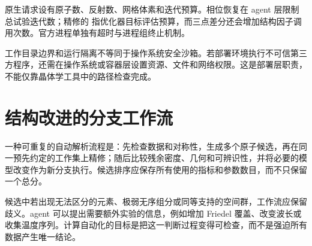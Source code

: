 原生请求设有原子数、反射数、网格体素和迭代预算。相位恢复在 agent 层限制总试验迭代数；精修的  指优化器目标评估预算，而三点差分还会增加结构因子调用次数。官方进程单独有超时与进程组终止机制。

工作目录边界和运行隔离不等同于操作系统安全沙箱。若部署环境执行不可信第三方程序，还需在操作系统或容器层设置资源、文件和网络权限。这是部署层职责，不能仅靠晶体学工具中的路径检查完成。

\section{结构改进的分支工作流}
一种可重复的自动解析流程是：先检查数据和对称性，生成多个原子候选，再在同一预先约定的工作集上精修；随后比较残余密度、几何和可辨识性，并将必要的模型改变作为新分支执行。候选排序应保存所有使用的指标和参数数目，而不只保留一个总分。

候选中若出现无法区分的元素、极弱无序组分或同等支持的空间群，工作流应保留歧义。agent 可以提出需要额外实验的信息，例如增加 Friedel 覆盖、改变波长或收集温度序列。计算自动化的目标是把这一判断过程变得可检查，而不是强迫所有数据产生唯一结论。
